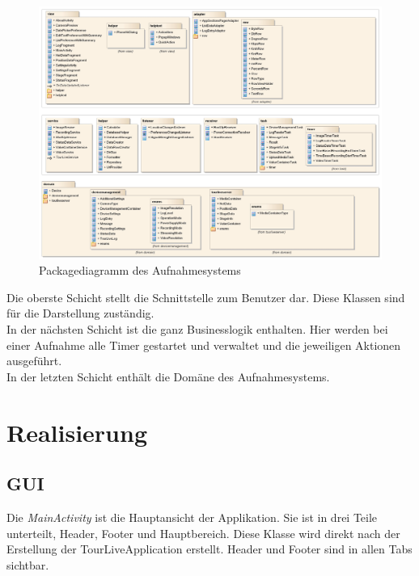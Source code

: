 \begin{figure}[H]
	\centering
	\includegraphics[width=150mm]{images/android/schichten.jpg}
	\caption{Packagediagramm des Aufnahmesystems}
\end{figure}

Die oberste Schicht stellt die Schnittstelle zum Benutzer dar. Diese Klassen sind für die Darstellung zuständig.\\
In der nächsten Schicht ist die ganz Businesslogik enthalten. Hier werden bei einer Aufnahme alle Timer gestartet und verwaltet und die jeweiligen Aktionen ausgeführt. \\
In der letzten Schicht enthält die Domäne des Aufnahmesystems.

\section{Realisierung}

\subsection{GUI}
Die \textit{MainActivity} ist die Hauptansicht der Applikation. Sie ist in drei Teile unterteilt, Header, Footer und Hauptbereich. Diese Klasse wird direkt nach der Erstellung der TourLiveApplication erstellt. Header und Footer sind in allen Tabs sichtbar.

